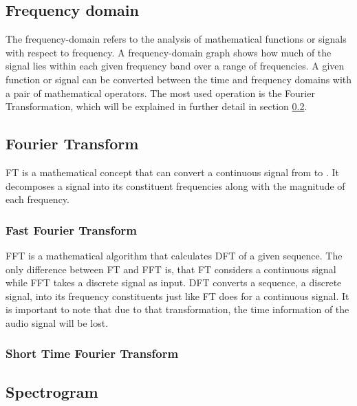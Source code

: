 \subsection{Frequency domain}
\label{sub:Frequency-Domain}

The frequency-domain refers to the analysis of mathematical functions or signals with respect to frequency. A frequency-domain graph shows how much of the signal lies within each given frequency band over a range of frequencies. 
\newline
\newline
A given function or signal can be converted between the time and frequency domains with a pair of mathematical operators. The most used operation is the Fourier Transformation, which will be explained in further detail in section \ref{sub:Fourier-Transform}.

\subsection{Fourier Transform}
\label{sub:Fourier-Transform}

\gls{FT} is a mathematical concept that can convert a continuous signal from  to . It decomposes a signal into its constituent frequencies along with the magnitude of each frequency.

\subsubsection{Fast Fourier Transform}
\label{subsub:Fast-Fourier-Transform}

\gls{FFT} is a mathematical algorithm that calculates \gls{DFT} of a given sequence. The only difference between \gls{FT} and \gls{FFT} is, that \gls{FT} considers a continuous signal while \gls{FFT} takes a discrete signal as input. \gls{DFT} converts a sequence, a discrete signal, into its frequency constituents just like \gls{FT} does for a continuous signal. It is important to note that due to that transformation, the time information of the audio signal will be lost.

\subsubsection{Short Time Fourier Transform}
\label{subsub:Short-Time-Fourier-Transform}

\subsection{Spectrogram}
\label{sub:Spectrogram}

